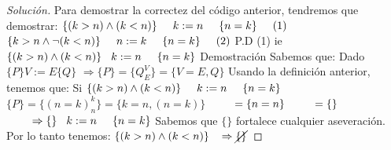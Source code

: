 \begin{proof}[Solución]
Para demostrar la correctez del código anterior, tendremos que demostrar:
\newline
$\{(k>n) \wedge (k<n) \} \hspace*{0.5cm}  k:=n \hspace*{.5cm} \{n=k \} \hspace*{.5cm} (1)$   
\newline
$\{k>n \wedge \neg (k<n) \} \hspace*{0.5cm}  n:=k \hspace*{.5cm} \{n=k \} \hspace*{.5cm} (2)$   
\vspace*{0.5cm}
\newline
P.D (1) ie $ \{(k>n) \wedge (k<n) \} \hspace*{0.3cm}  k:=n \hspace*{.5cm} \{n=k \} $   
\vspace*{0.5cm}
\newline
Demostración
\vspace*{0.3cm}
\newline
Sabemos que:
\newline
Dado $\{P\} V:=E \{Q\}$
\newline
$\Rightarrow  \{P\} = \{Q_{E}^{V} \} = \{V=E, Q \} $
\vspace*{0.3cm}
\newline
Usando la definición anterior, tenemos que:
Si $ \{(k>n) \wedge (k<n) \} \hspace*{0.5cm}  k:=n \hspace*{.5cm} \{n=k\} $  
\newline
$ \{ P \} = \{ (n=k)_{n}^{k} \} = \{k=n,(n=k)\} $
\newline
$ \hspace*{0.8cm} =\{ n=n \}$
\newline
$ \hspace*{0.8cm} = \{ \} $
\newline
$ \hspace*{0.8cm} \Rightarrow  \{ \} \hspace*{0.3cm} k:=n \hspace*{.5cm} \{n=k\} $
\newline
Sabemos que $ \{ \} $ fortalece cualquier aseveración.
\vspace*{0.3cm}
\newline
Por lo tanto tenemos:
\newline
$ \{(k>n) \wedge (k<n) \} \hspace*{0.3cm} \Rightarrow  \cancel{\{ \}}$

\end{proof}
